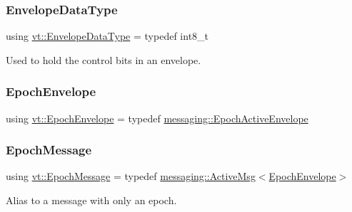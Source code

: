 \mbox{\label{namespacevt_a2740126d59f361d9ba46f66b3b4b0d3d}} 
\subsubsection{\texorpdfstring{Envelope\+Data\+Type}{EnvelopeDataType}}
{\footnotesize\ttfamily using \hyperlink{namespacevt_a2740126d59f361d9ba46f66b3b4b0d3d}{vt\+::\+Envelope\+Data\+Type} = typedef int8\+\_\+t}



Used to hold the control bits in an envelope. 

\mbox{\label{namespacevt_af71a025689a3da5037785b53a7a8e78c}} 
\subsubsection{\texorpdfstring{Epoch\+Envelope}{EpochEnvelope}}
{\footnotesize\ttfamily using \hyperlink{namespacevt_af71a025689a3da5037785b53a7a8e78c}{vt\+::\+Epoch\+Envelope} = typedef \hyperlink{structvt_1_1messaging_1_1_epoch_active_envelope}{messaging\+::\+Epoch\+Active\+Envelope}}

\mbox{\label{namespacevt_ad67368ffae52d7325002586b41bb150e}} 
\subsubsection{\texorpdfstring{Epoch\+Message}{EpochMessage}}
{\footnotesize\ttfamily using \hyperlink{namespacevt_ad67368ffae52d7325002586b41bb150e}{vt\+::\+Epoch\+Message} = typedef \hyperlink{structvt_1_1messaging_1_1_active_msg}{messaging\+::\+Active\+Msg}$<$\hyperlink{namespacevt_af71a025689a3da5037785b53a7a8e78c}{Epoch\+Envelope}$>$}



Alias to a message with only an epoch. 

\mbox{\label{namespacevt_af23b58014ced6898422213a0e5e6a27a}} 
